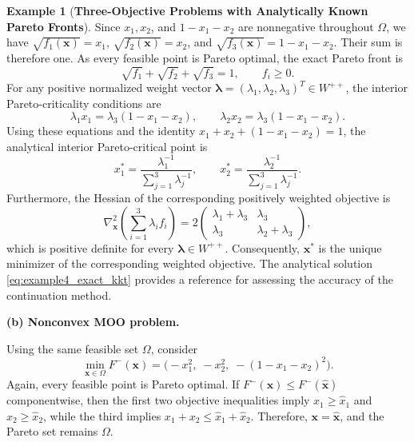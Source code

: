 \documentclass[11pt,pdflatex,sn-mathphys-ay]{sn-jnl}%
\theoremstyle{definition}
\theoremstyle{thmstyleone}%
\theoremstyle{thmstyletwo}%
\newtheorem{example}{Example}%
\theoremstyle{thmstylethree}%
\newcommand{\add}[1]{\textcolor{revisionblue}{#1}}
\begin{document}
\begin{example}[\textbf{Three-Objective Problems with Analytically Known Pareto Fronts}]
		
		\add{Since $x_1,x_2$, and $1-x_1-x_2$ are nonnegative
			throughout $\Omega$, we have
			$\sqrt{f_1(\bm{x})}=x_1$,
			$\sqrt{f_2(\bm{x})}=x_2$, and
			$\sqrt{f_3(\bm{x})}=1-x_1-x_2$.
			Their sum is therefore one. As every feasible point
			is Pareto optimal, the exact Pareto front is
			\begin{equation}
				\label{eq:example4_convex_pf}
				\sqrt{f_1}+\sqrt{f_2}+\sqrt{f_3}=1,
				\qquad f_i\geq0.
			\end{equation}
			For any positive normalized weight vector
			$\bm{\lambda}=(\lambda_1,\lambda_2,\lambda_3)^T\in W^{++}$,
			the interior Pareto-criticality conditions are
			\[
			\lambda_1x_1
			=
			\lambda_3(1-x_1-x_2),
			\qquad
			\lambda_2x_2
			=
			\lambda_3(1-x_1-x_2).
			\]
			Using these equations and the identity
			$x_1+x_2+(1-x_1-x_2)=1$, the analytical interior
			Pareto-critical point is
			\begin{equation}
				\label{eq:example4_exact_kkt}
				x_1^*=
				\frac{\lambda_1^{-1}}
				{\sum_{j=1}^3\lambda_j^{-1}},
				\qquad
				x_2^*=
				\frac{\lambda_2^{-1}}
				{\sum_{j=1}^3\lambda_j^{-1}}.
			\end{equation}
			Furthermore, the Hessian of the corresponding positively weighted
			objective is
			\[
			\nabla_{\bm{x}}^2
			\left(\sum_{i=1}^3\lambda_i f_i\right)
			=
			2\begin{pmatrix}
				\lambda_1+\lambda_3 & \lambda_3\\
				\lambda_3 & \lambda_2+\lambda_3
			\end{pmatrix},
			\]
			which is positive definite for every $\bm{\lambda}\in W^{++}$.
			Consequently, $\bm{x}^*$ is the unique minimizer of the
			corresponding weighted objective. The analytical solution
			\eqref{eq:example4_exact_kkt} provides a reference for assessing
			the accuracy of the continuation method.}
		
		\medskip
		\noindent\textbf{(b) Nonconvex MOO problem.}
		
		Using the same feasible set $\Omega$, consider
		\begin{equation}
			\label{eq:example4_concave}
			\min_{\bm{x}\in\Omega}
			F^-(\bm{x})
			=
			\bigl(-x_1^2,\;-x_2^2,\;-(1-x_1-x_2)^2\bigr).
		\end{equation}
		Again, every feasible point is Pareto optimal. If
		$F^-(\bm{x})\leq F^-(\widehat{\bm{x}})$ componentwise,
		then the first two objective inequalities imply
		$x_1\geq\widehat{x}_1$ and
		$x_2\geq\widehat{x}_2$, while the third implies
		$x_1+x_2\leq\widehat{x}_1+\widehat{x}_2$.
		Therefore, $\bm{x}=\widehat{\bm{x}}$, and the Pareto set
		remains $\Omega$.
		

\end{example}
\end{document}
